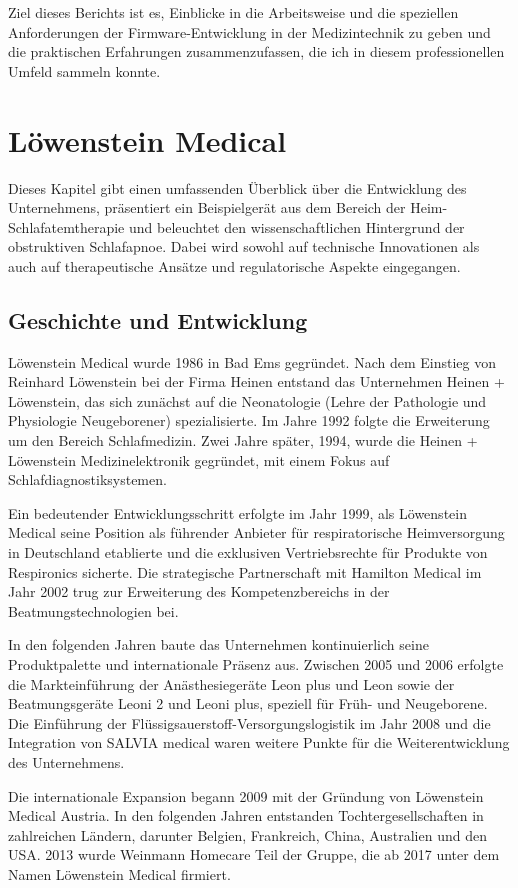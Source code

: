 \documentclass[a4paper, 12pt]{article}
\begin{document}
Ziel dieses Berichts ist es, Einblicke in die Arbeitsweise und die speziellen Anforderungen der Firmware-Entwicklung in der Medizintechnik zu geben und die praktischen Erfahrungen zusammenzufassen, die ich in diesem professionellen Umfeld sammeln konnte. 

\newpage
\section{Löwenstein Medical}\label{loewenstein}
Dieses Kapitel gibt einen umfassenden Überblick über die Entwicklung des Unternehmens, präsentiert ein Beispielgerät aus dem Bereich der Heim-Schlafatemtherapie und beleuchtet den wissenschaftlichen Hintergrund der obstruktiven Schlafapnoe. Dabei wird sowohl auf technische Innovationen als auch auf therapeutische Ansätze und regulatorische Aspekte eingegangen.

\subsection{Geschichte und Entwicklung}
Löwenstein Medical wurde 1986 in Bad Ems gegründet. Nach dem Einstieg von Reinhard Löwenstein bei der Firma Heinen entstand das Unternehmen Heinen + Löwenstein, das sich zunächst auf die Neonatologie (Lehre der Pathologie und Physiologie Neugeborener) spezialisierte. Im Jahre 1992 folgte die Erweiterung um den Bereich Schlafmedizin. Zwei Jahre später, 1994, wurde die Heinen + Löwenstein Medizinelektronik gegründet, mit einem Fokus auf Schlafdiagnostiksystemen.

Ein bedeutender Entwicklungsschritt erfolgte im Jahr 1999, als Löwenstein Medical seine Position als führender Anbieter für respiratorische Heimversorgung in Deutschland etablierte und die exklusiven Vertriebsrechte für Produkte von Respironics sicherte. Die strategische Partnerschaft mit Hamilton Medical im Jahr 2002 trug zur Erweiterung des Kompetenzbereichs in der Beatmungstechnologien bei.

In den folgenden Jahren baute das Unternehmen kontinuierlich seine Produktpalette und internationale Präsenz aus. Zwischen 2005 und 2006 erfolgte die Markteinführung der Anästhesiegeräte Leon plus und Leon sowie der Beatmungsgeräte Leoni 2 und Leoni plus, speziell für Früh- und Neugeborene. Die Einführung der Flüssigsauerstoff-Versorgungslogistik im Jahr 2008 und die Integration von SALVIA medical waren weitere Punkte für die Weiterentwicklung des Unternehmens.

Die internationale Expansion begann 2009 mit der Gründung von Löwenstein Medical Austria. In den folgenden Jahren entstanden Tochtergesellschaften in zahlreichen Ländern, darunter Belgien, Frankreich, China, Australien und den USA. 2013 wurde Weinmann Homecare Teil der Gruppe, die ab 2017 unter dem Namen Löwenstein Medical firmiert.
\end{document}
